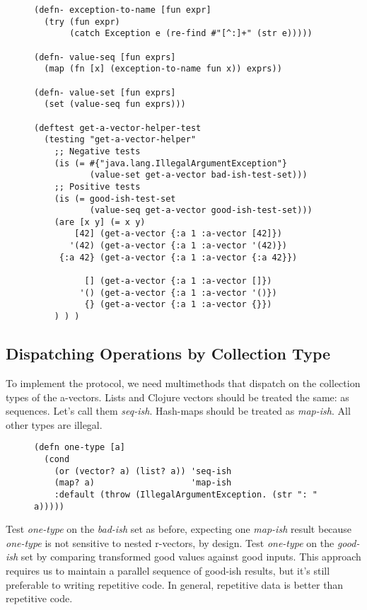 \documentclass[11pt]{article}
\begin{document}
\begin{figure}[H]
\label{get-a-vector-helper-test}
\begin{verbatim}
(defn- exception-to-name [fun expr]
  (try (fun expr)
       (catch Exception e (re-find #"[^:]+" (str e)))))

(defn- value-seq [fun exprs]
  (map (fn [x] (exception-to-name fun x)) exprs))

(defn- value-set [fun exprs]
  (set (value-seq fun exprs)))

(deftest get-a-vector-helper-test
  (testing "get-a-vector-helper"
    ;; Negative tests
    (is (= #{"java.lang.IllegalArgumentException"}
           (value-set get-a-vector bad-ish-test-set)))
    ;; Positive tests
    (is (= good-ish-test-set
           (value-seq get-a-vector good-ish-test-set)))
    (are [x y] (= x y)
        [42] (get-a-vector {:a 1 :a-vector [42]})
       '(42) (get-a-vector {:a 1 :a-vector '(42)})
     {:a 42} (get-a-vector {:a 1 :a-vector {:a 42}})

          [] (get-a-vector {:a 1 :a-vector []})
         '() (get-a-vector {:a 1 :a-vector '()})
          {} (get-a-vector {:a 1 :a-vector {}})
    ) ) )
\end{verbatim}
\end{figure}
\subsection{Dispatching Operations by Collection Type}
\label{sec-4-5}

To implement the protocol, we need multimethods that dispatch on the
collection types of the a-vectors. Lists and Clojure vectors should
be treated the same: as sequences. Let's call them
\emph{seq-ish}. Hash-maps should be treated as \emph{map-ish}. All other types
are illegal.

\begin{figure}[H]
\label{one-type}
\begin{verbatim}
(defn one-type [a]
  (cond
    (or (vector? a) (list? a)) 'seq-ish
    (map? a)                   'map-ish
    :default (throw (IllegalArgumentException. (str ": " a)))))
\end{verbatim}
\end{figure}

Test \emph{one-type} on the \emph{bad-ish} set as before, expecting one
\emph{map-ish} result because \emph{one-type} is not sensitive to nested
r-vectors, by design. Test \emph{one-type} on the \emph{good-ish} set by
comparing transformed good values against good inputs. This approach
requires us to maintain a parallel sequence of good-ish results, but
it's still preferable to writing repetitive code. In general,
repetitive data is better than repetitive code.
\end{document}
